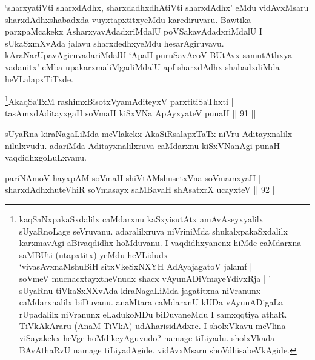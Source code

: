 \begin{artha}
`sharxyatiVti sharxdAdhx, sharxdadhxdhAtiVti sharxdAdhx' eMdu vidAvxMsaru sharxdAdhxshabadxda vuyxtapxtitxyeMdu karediruvaru. Bawtika parxpaMcakekx AsharxyavAdadxriMdalU poVSakavAdadxriMdalU I sUkaSxmXvAda jalavu sharxdedhxyeMdu hesarAgiruvavu. kAraNarUpavAgiruvadariMdalU `ApaH puruSavAcoV BUtAvx samutAthxya vadanitx' eMba upakarxmaliMgadiMdalU apf sharxdAdhx shabadxdiMda heVLalapxTiTxde.
\end{artha}


\begin{shl}
\footnote{kaqSaNxpakaSxdalilx caMdarxnu kaSxyisutAtx  amAvAseyxyalilx sUyaRnoLage seVruvanu. adaralilxruva niVriniMda  shukalxpakaSxdalilx karxmavAgi aBivaqdidhx hoMduvanu. I vaqdidhxyanenx  hiMde caMdarxna saMBUti (utapxtitx) yeMdu heVLidudx \\`vivasAvxnaMshuBiH sitxVkeSxNXYH AdAyajagatoV jalamf |\\ soVmeV mucnacxtayxtheVnudx shacx vAyunADiVmayeYdivxRja ||'\\ sUyaRnu  tiVkaSxNXvAda kiraNagaLiMda jagatitxna niVranunx caMdarxnalilx  biDuvanu. anaMtara caMdarxnU kUDa vAyunADigaLa rUpadalilx niVranunx  eLadukoMDu biDuvaneMdu I samxqqtiya athaR. TiVkAkAraru (AnaM-TiVkA)  udAharisidAdxre. I sholxVkavu meVlina viSayakekx heVge  hoMdikeyAguvudo? namage tiLiyadu. sholxVkada BAvAthaRvU namage  tiLiyadAgide. vidAvxMsaru shoVdhisabeVkAgide.}AkaqSaTxM rashimxBisotxVyamAditeyxV parxtitiSaThxti | \\
tasAmxdAditayxgaH soVmaH kiSxVNa ApAyxyateV punaH \hfill|| 91 || 
\end{shl}

\begin{artha}
sUyaRna kiraNagaLiMda meVlakekx AkaSiRsalapxTaTx niVru Aditayxnalilx 
nilulxvudu. adariMda Aditayxnalilxruva caMdarxnu kiSxVNanAgi punaH 
vaqdidhxgoLuLxvanu.
\end{artha}


\begin{shl}
pariNAmoV hayxpAM soVmaH shiVtAMshusetxVna soV\s mamxyaH | \\
sharxdAdhxhuteVhiR soVmasayx saMBavaH shAsatxrX ucayxteV \hfill|| 92 || 
\end{shl}

